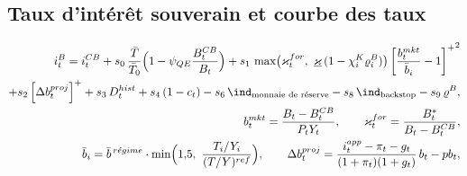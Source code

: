 \documentclass[11pt,a4paper]{article}
\newcommand{\pos}[1]{{\left[#1\right]^{+}}}
\begin{document}
\subsection{Taux d'intérêt souverain et courbe des taux}
\label{sec:spread}
\begin{equation}
\begin{split}
i^B_t = i^{CB}_t + s_0\,\frac{\bar T}{\bar T_0}\Big(1 - \psi_{QE}\frac{B^{CB}_t}{B_t}\Big) + s_1\,\max\!\big(\varkappa^{for}_t,\ \underline\varkappa\,(1-\chi^K_i\varrho^B_i)\big)\,\pos{\frac{b^{mkt}_t}{\bar b_{i}} - 1}^2\\
+ s_2\, \pos{\Delta b^{proj}_t} + s_3\, D^{hist}_t + s_4\,(1-c_t) - s_6\,\ind_{\text{monnaie de réserve}} - s_8\,\ind_{\text{backstop}} - s_9\,\varrho^B,\\
 b^{mkt}_t = \frac{B_t - B^{CB}_t}{P_tY_t}, \qquad \varkappa^{for}_t = \frac{B^\ast_t}{B_t-B^{CB}_t},\\
\bar b_i = \bar b^{\,r\acute{e}gime}\cdot\min\!\Big(1{,}5,\ \frac{T_i/Y_i}{(T/Y)^{ref}}\Big), \qquad \Delta b^{proj}_t = \frac{i^{app}_t-\pi_t-g_t}{(1+\pi_t)(1+g_t)}\,b_t - pb_t,
\end{split}
\label{eq:spread}
\end{equation}
\end{document}
